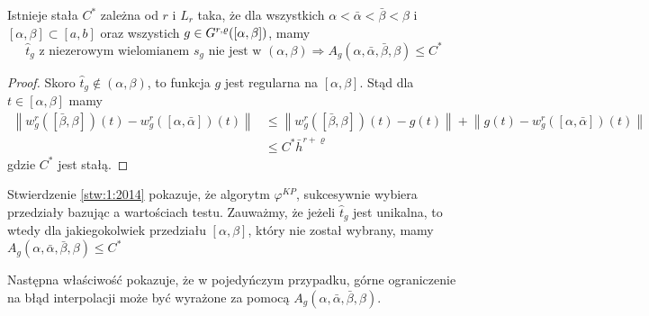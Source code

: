 \documentclass[oik, pdftex, robocza, man]{mgrwms}
\begin{document}
    \begin{stw} \label{stw:1:2014}
        Istnieje stała $C^{*}$ zależna od $r$ i $L_{r}$ taka, że dla wszystkich $\alpha < \bar{\alpha} < \bar{\beta} < \beta$ i $[\alpha, \beta] \subset [a, b]$ oraz wszystich $g \in G^{r,\varrho}([\alpha,\beta])$, mamy
        \begin{equation*}
            \hat{t}_{g} \text{ z niezerowym wielomianem } s_{g} \text{ nie jest w } (\alpha, \beta) \Longrightarrow A_{g}(\alpha, \bar{\alpha}, \bar{\beta}, \beta) \leq C^{*}
        \end{equation*}
    \end{stw}
    \begin{proof}
        Skoro $\hat{t}_{g} \notin (\alpha, \beta)$, to funkcja $g$ jest regularna na $[\alpha, \beta]$. Stąd dla $t \in[\alpha, \beta]$ mamy
        \begin{equation*}
            \begin{aligned}
                \left\|w_{g}^{r}([\bar{\beta}, \beta])(t)-w_{g}^{r}([\alpha, \bar{\alpha}])(t)\right\| & \leq\left\|w_{g}^{r}([\bar{\beta}, \beta])(t)-g(t)\right\|+\left\|g(t)-w_{g}^{r}([\alpha, \bar{\alpha}])(t)\right\| \\
                & \leq C^{*} \bar{h}^{r+\varrho}
            \end{aligned}
        \end{equation*}
    gdzie $C^{*}$ jest stałą.
    \end{proof}

    \begin{uw} \label{uw:1}
        Stwierdzenie \eqref{stw:1:2014} pokazuje, że algorytm $\varphi^{KP}$, sukcesywnie wybiera przedziały bazując a wartościach testu. Zauważmy, że jeżeli $\hat{t}_{g}$ jest unikalna, to wtedy dla jakiegokolwiek przedziału $[\alpha, \beta]$, który nie został wybrany, mamy $A_{g}(\alpha, \bar{\alpha}, \bar{\beta}, \beta) \leq C^{*}$
    \end{uw}

    Następna właściwość pokazuje, że w pojedyńczym przypadku, górne ograniczenie na błąd interpolacji może być wyrażone za pomocą $A_{g}(\alpha, \bar{\alpha}, \bar{\beta}, \beta)$.
\end{document}
